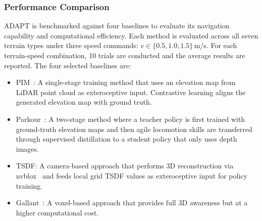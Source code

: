 \subsubsection{Performance Comparison}
ADAPT is benchmarked against four baselines to evaluate its navigation capability and computational efficiency.
Each method is evaluated across all seven terrain types under three speed commands: $v \in \{0.5, 1.0, 1.5\}$\,m/s.
For each terrain-speed combination, 10 trials are conducted and the average results are reported.
The four selected baselines are:
\begin{itemize}
    \item PIM~\cite{long2025learning}: A single-stage training method that uses an elevation map from LiDAR point cloud as exteroceptive input. Contrastive learning aligns the generated elevation map with ground truth.
    \item Parkour~\cite{zhuang2024humanoid}: A two-stage method where a teacher policy is first trained with ground-truth elevation maps and then agile locomotion skills are transferred through supervised distillation to a student policy that only uses depth images.
    \item TSDF: A camera-based approach that performs 3D reconstruction via nvblox~\cite{nvblox_2023_GPUAcceleratedSDFMapping} and feeds local grid TSDF values as exteroceptive input for policy training.
    \item Gallant~\cite{Ben_2025_Gallant}: A voxel-based approach that provides full 3D awareness but at a higher computational cost.
\end{itemize}

